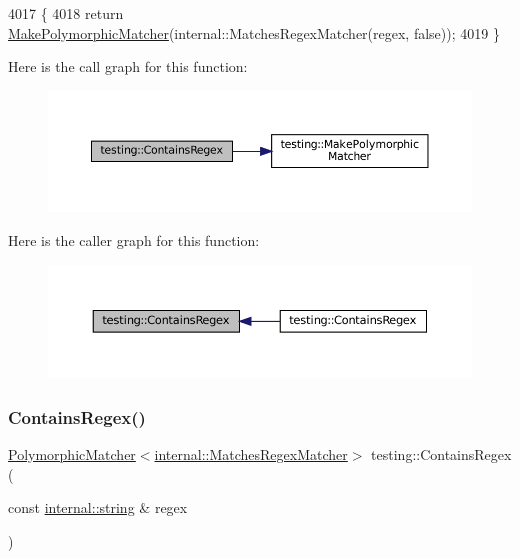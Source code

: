 \begin{DoxyCode}
4017                              \{
4018   \textcolor{keywordflow}{return} \hyperlink{namespacetesting_a667ca94f190ec2e17ee2fbfdb7d3da04}{MakePolymorphicMatcher}(internal::MatchesRegexMatcher(regex, \textcolor{keyword}{false}));
4019 \}
\end{DoxyCode}
Here is the call graph for this function\+:
\nopagebreak
\begin{figure}[H]
\begin{center}
\leavevmode
\includegraphics[width=350pt]{namespacetesting_a899838630a71376aa071dfd7c500f2ca_cgraph}
\end{center}
\end{figure}
Here is the caller graph for this function\+:
\nopagebreak
\begin{figure}[H]
\begin{center}
\leavevmode
\includegraphics[width=350pt]{namespacetesting_a899838630a71376aa071dfd7c500f2ca_icgraph}
\end{center}
\end{figure}
\mbox{\label{namespacetesting_ad8efafa15630a8274f41f5e22f8f0e49}} 
\subsubsection{\texorpdfstring{Contains\+Regex()}{ContainsRegex()}\hspace{0.1cm}{\footnotesize\ttfamily [2/2]}}
{\footnotesize\ttfamily \hyperlink{classtesting_1_1PolymorphicMatcher}{Polymorphic\+Matcher}$<$\hyperlink{classtesting_1_1internal_1_1MatchesRegexMatcher}{internal\+::\+Matches\+Regex\+Matcher}$>$ testing\+::\+Contains\+Regex (\begin{DoxyParamCaption}\item[{const \hyperlink{namespacetesting_1_1internal_a8e8ff5b11e64078831112677156cb111}{internal\+::string} \&}]{regex }\end{DoxyParamCaption})\hspace{0.3cm}{\ttfamily [inline]}}



